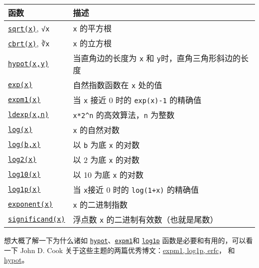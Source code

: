 \begin{table}[h]

\begin{tabulary}{\linewidth}{|L|L|}
\hline
函数 & 描述 \\
\hline
\hyperlink{4551113327515323898}{\texttt{sqrt(x)}}, \texttt{√x} & \texttt{x} 的平方根 \\
\hline
\hyperlink{15104025502404840355}{\texttt{cbrt(x)}}, \texttt{∛x} & \texttt{x} 的立方根 \\
\hline
\hyperlink{18304489571285447949}{\texttt{hypot(x,y)}} & 当直角边的长度为 \texttt{x} 和 \texttt{y}时，直角三角形斜边的长度 \\
\hline
\hyperlink{5801729597955756107}{\texttt{exp(x)}} & 自然指数函数在 \texttt{x} 处的值 \\
\hline
\hyperlink{4939309737829480377}{\texttt{expm1(x)}} & 当 \texttt{x} 接近 0 时的 \texttt{exp(x)-1} 的精确值 \\
\hline
\hyperlink{14721177606508229464}{\texttt{ldexp(x,n)}} & \texttt{x*2{\textasciicircum}n} 的高效算法，\texttt{n} 为整数 \\
\hline
\hyperlink{17317607370922767936}{\texttt{log(x)}} & \texttt{x} 的自然对数 \\
\hline
\hyperlink{17317607370922767936}{\texttt{log(b,x)}} & 以 \texttt{b} 为底 \texttt{x} 的对数 \\
\hline
\hyperlink{18341149201477905713}{\texttt{log2(x)}} & 以 2 为底 \texttt{x} 的对数 \\
\hline
\hyperlink{3481560771470480868}{\texttt{log10(x)}} & 以 10 为底 \texttt{x} 的对数 \\
\hline
\hyperlink{5533050447473188877}{\texttt{log1p(x)}} & 当 \texttt{x}接近 0 时的 \texttt{log(1+x)} 的精确值 \\
\hline
\hyperlink{39736318364195845}{\texttt{exponent(x)}} & \texttt{x} 的二进制指数 \\
\hline
\hyperlink{11312242195671521747}{\texttt{significand(x)}} & 浮点数 \texttt{x} 的二进制有效数（也就是尾数） \\
\hline
\end{tabulary}

\end{table}



想大概了解一下为什么诸如 \hyperlink{18304489571285447949}{\texttt{hypot}}、\hyperlink{4939309737829480377}{\texttt{expm1}}和 \hyperlink{5533050447473188877}{\texttt{log1p}} 函数是必要和有用的，可以看一下 John D. Cook 关于这些主题的两篇优秀博文：\href{https://www.johndcook.com/blog/2010/06/07/math-library-functions-that-seem-unnecessary/}{expm1, log1p, erfc}， 和 \href{https://www.johndcook.com/blog/2010/06/02/whats-so-hard-about-finding-a-hypotenuse/}{hypot}。



